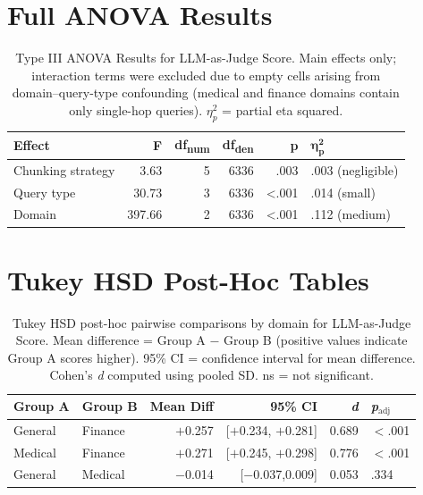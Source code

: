 \documentclass[12pt]{article}
\begin{document}
\section{Full ANOVA Results}
\label{app:anova}

\begin{table}[h]
\centering
\caption{Type III ANOVA Results for LLM-as-Judge Score. Main effects only; interaction terms were excluded due to empty cells arising from domain--query-type confounding (medical and finance domains contain only single-hop queries). $\eta^2_p$ = partial eta squared.}
\label{tab:anova}
\begin{tabular}{lrrrrl}
\toprule
\textbf{Effect} & \textbf{F} & \textbf{df\textsubscript{num}} & \textbf{df\textsubscript{den}} & \textbf{p} & $\boldsymbol{\eta^2_p}$ \\
\midrule
Chunking strategy & 3.63 & 5 & 6336 & .003 & .003 (negligible) \\
Query type        & 30.73 & 3 & 6336 & <.001 & .014 (small) \\
Domain            & 397.66 & 2 & 6336 & <.001 & .112 (medium) \\
\bottomrule
\end{tabular}
\end{table}
 
\section{Tukey HSD Post-Hoc Tables}
\label{app:tukey}

\begin{table}[h]
\centering
\caption{Tukey HSD post-hoc pairwise comparisons by domain for LLM-as-Judge Score. Mean difference = Group A $-$ Group B (positive values indicate Group A scores higher). 95\% CI = confidence interval for mean difference. Cohen's \textit{d} computed using pooled SD. ns = not significant.}
\label{tab:tukey_domain}
\begin{tabular}{llrrrl}
\toprule
\textbf{Group A} & \textbf{Group B} & \textbf{Mean Diff} & \textbf{95\% CI} & \textbf{\textit{d}} & \textbf{\textit{p}$_{\text{adj}}$} \\
\midrule
General & Finance & $+$0.257 & [$+$0.234, $+$0.281] & 0.689 & $<$.001 \\
Medical & Finance & $+$0.271 & [$+$0.245, $+$0.298] & 0.776 & $<$.001 \\
General & Medical & $-$0.014 & [$-$0.037,\hphantom{$-$}0.009] & 0.053 & .334 \\
\bottomrule
\end{tabular}
\end{table}
 
\end{document}
